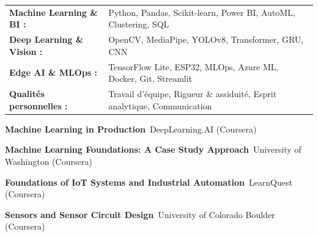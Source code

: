 \documentclass[10pt,a4paper]{../altacv}
\begin{document}
{\small
\begin{tabular}{@{}ll@{}}
\textbf{Machine Learning \& BI :} & Python, Pandas, Scikit-learn, Power BI, AutoML, Clustering, SQL \\[1.5pt]
\textbf{Deep Learning \& Vision :} & OpenCV, MediaPipe, YOLOv8, Transformer, GRU, CNN \\[1.5pt]
\textbf{Edge AI \& MLOps :} & TensorFlow Lite, ESP32, MLOps, Azure ML, Docker, Git, Streamlit \\[1.5pt]
\textbf{Qualités personnelles :} & Travail d’équipe, Rigueur \& assiduité, Esprit analytique, Communication
\end{tabular}
}

\begin{cvitems}
  \item \textbf{Machine Learning in Production}~\hfill {\color{emphasis}DeepLearning.AI (Coursera)}
  \item \textbf{Machine Learning Foundations: A Case Study Approach}~\hfill {\color{emphasis}University of Washington (Coursera)}
  \item \textbf{Foundations of IoT Systems and Industrial Automation}~\hfill {\color{emphasis}LearnQuest (Coursera)}
  \item \textbf{Sensors and Sensor Circuit Design}~\hfill {\color{emphasis}University of Colorado Boulder (Coursera)}
\end{cvitems}

\cvactivites
\cvlangues
\end{document}

